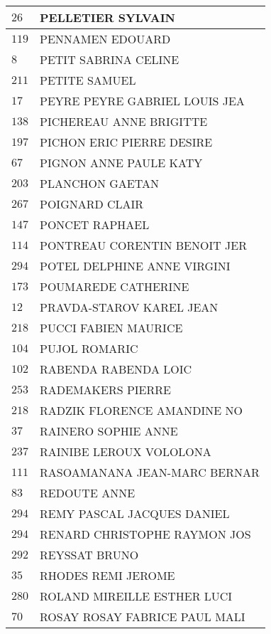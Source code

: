 \begin{xltabular}{\linewidth}{|l|X|}
    \hline
    $26$ & PELLETIER SYLVAIN \\
    \hline
    $119$ & PENNAMEN EDOUARD \\
    \hline
    $8$ & PETIT SABRINA CELINE \\
    \hline
    $211$ & PETITE SAMUEL \\
    \hline
    $17$ & PEYRE PEYRE GABRIEL LOUIS JEA \\
    \hline
    $138$ & PICHEREAU ANNE BRIGITTE \\
    \hline
    $197$ & PICHON ERIC PIERRE DESIRE \\
    \hline
    $67$ & PIGNON ANNE PAULE KATY \\
    \hline
    $203$ & PLANCHON GAETAN \\
    \hline
    $267$ & POIGNARD CLAIR \\
    \hline
    $147$ & PONCET RAPHAEL \\
    \hline
    $114$ & PONTREAU CORENTIN BENOIT JER \\
    \hline
    $294$ & POTEL DELPHINE ANNE VIRGINI \\
    \hline
    $173$ & POUMAREDE CATHERINE \\
    \hline
    $12$ & PRAVDA-STAROV KAREL JEAN \\
    \hline
    $218$ & PUCCI FABIEN MAURICE \\
    \hline
    $104$ & PUJOL ROMARIC \\
    \hline
    $102$ & RABENDA RABENDA LOIC \\
    \hline
    $253$ & RADEMAKERS PIERRE \\
    \hline
    $218$ & RADZIK FLORENCE AMANDINE NO \\
    \hline
    $37$ & RAINERO SOPHIE ANNE \\
    \hline
    $237$ & RAINIBE LEROUX VOLOLONA \\
    \hline
    $111$ & RASOAMANANA JEAN-MARC BERNAR \\
    \hline
    $83$ & REDOUTE ANNE \\
    \hline
    $294$ & REMY PASCAL JACQUES DANIEL \\
    \hline
    $294$ & RENARD CHRISTOPHE RAYMON JOS \\
    \hline
    $292$ & REYSSAT BRUNO \\
    \hline
    $35$ & RHODES REMI JEROME \\
    \hline
    $280$ & ROLAND MIREILLE ESTHER LUCI \\
    \hline
    $70$ & ROSAY ROSAY FABRICE PAUL MALI \\

\end{xltabular}
